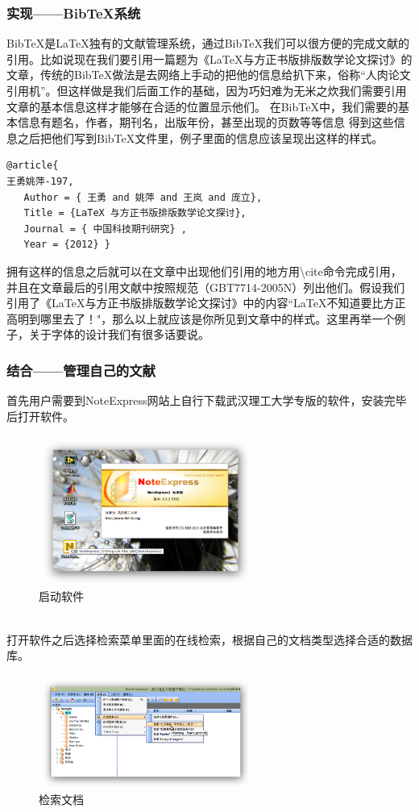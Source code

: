 \subsubsection{实现——Bib\TeX 系统}
Bib\TeX 是\LaTeX 独有的文献管理系统，通过Bib\TeX 我们可以很方便的完成文献的引用。比如说现在我们要引用一篇题为《LaTeX与方正书版排版数学论文探讨》的文章，传统的Bib\TeX 做法是去网络上手动的把他的信息给扒下来，俗称“人肉论文引用机”。但这样做是我们后面工作的基础，因为巧妇难为无米之炊我们需要引用文章的基本信息这样才能够在合适的位置显示他们。
在Bib\TeX 中，我们需要的基本信息有题名，作者，期刊名，出版年份，甚至出现的页数等等信息
得到这些信息之后把他们写到Bib\TeX 文件里，例子里面的信息应该呈现出这样的样式。
\begin{lstlisting}[language=TeX]
@article{
王勇姚萍-197,
   Author = { 王勇 and 姚萍 and 王岚 and 庞立},
   Title = {LaTeX 与方正书版排版数学论文探讨},
   Journal = { 中国科技期刊研究} ,
   Year = {2012} }

\end{lstlisting}
拥有这样的信息之后就可以在文章中出现他们引用的地方用\textbackslash cite命令完成引用，并且在文章最后的引用文献中按照规范（GBT7714-2005N）列出他们。假设我们引用了《LaTeX与方正书版排版数学论文探讨》中的内容“LaTeX不知道要比方正高明到哪里去了！"\cite{王勇姚萍-197}，那么以上就应该是你所见到文章中的样式。这里再举一个例子，关于字体的设计我们有很多话要说。\cite{吴昉张页-198}
\subsubsection{结合——管理自己的文献}
首先用户需要到NoteExpress网站上自行下载武汉理工大学专版的软件，安装完毕后打开软件。
\begin{figure}[htbp]
\centering
\includegraphics[width=7cm]{figure/1}
\caption{启动软件}
\label{fig:1}
\end{figure} \\

打开软件之后选择检索菜单里面的在线检索，根据自己的文档类型选择合适的数据库。
\begin{figure}[htb]
\centering
\includegraphics[width=7cm]{figure/2}
\caption{检索文档}
\label{fig:2}
\end{figure} \\


